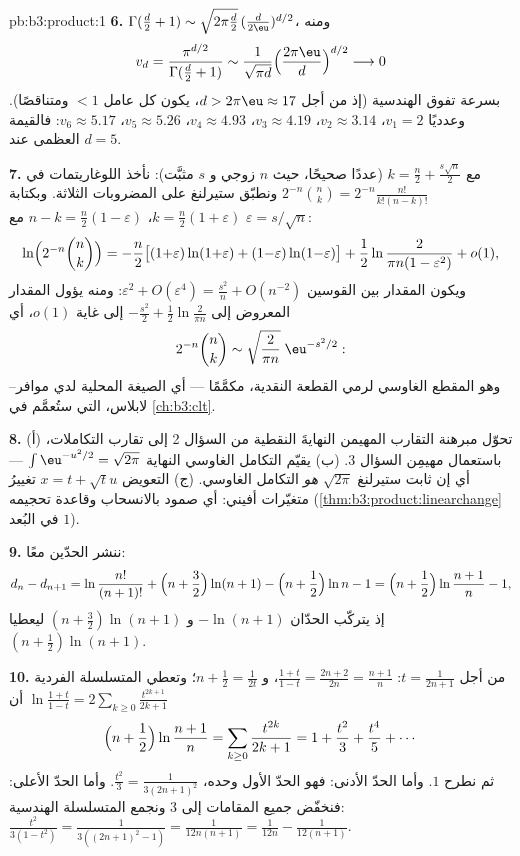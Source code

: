 \begin{solution}{pb:b3:product:1}
\textbf{6.} $\Gamma(\frac d2 + 1) \sim \sqrt{2\pi\frac
d2}\,(\frac d{2\eu})^{d/2}$، ومنه
\[
v_d = \frac{\pi^{d/2}}{\Gamma(\frac d2 + 1)}
\sim \frac{1}{\sqrt{\pi d}}\Bigl(\frac{2\pi\eu}
d\Bigr)^{d/2} \longrightarrow 0
\]
بسرعة تفوق الهندسية (إذ من أجل $d > 2\pi\eu \approx 17$، يكون كل عامل
$< 1$ ومتناقصًا). وعدديًا $v_1 = 2$، $v_2 \approx
3.14$، $v_3 \approx 4.19$،
$v_4 \approx 4.93$، $v_5 \approx
5.26$، $v_6 \approx 5.17$: فالقيمة العظمى عند $d = 5$.

\textbf{7.} مع $k = \frac n2 + \frac{s\sqrt n}2$ (عددًا صحيحًا، حيث $n$ زوجي و $s$
مثبَّت): نأخذ اللوغاريتمات في $2^{-n}\binom nk =
2^{-n}\frac{n!}{k!(n-k)!}$ ونطبّق ستيرلنغ على
المضروبات الثلاثة. وبكتابة $k = \frac n2(1 + \varepsilon)$، $n - k =
\frac n2(1 - \varepsilon)$ مع $\varepsilon = s/\sqrt n$:
\[
\ln\Bigl(2^{-n}\binom nk\Bigr)
= -\frac n2\bigl[(1{+}\varepsilon)\ln(1{+}\varepsilon) +
(1{-}\varepsilon)\ln(1{-}\varepsilon)\bigr]
+ \frac12\ln\frac{2}{\pi n(1 - \varepsilon^2)} + o(1),
\]
ويكون المقدار بين القوسين $\varepsilon^2 + O(\varepsilon^4) =
\frac{s^2}n + O(n^{-2})$: ومنه يؤول المقدار المعروض
إلى $-\frac{s^2}2 +
\frac12\ln\frac2{\pi n}$ إلى غاية $o(1)$، أي
\[
2^{-n}\binom nk \sim \sqrt{\frac{2}{\pi
n}}\;\eu^{-s^2/2} :
\]
وهو المقطع الغاوسي لرمي القطعة النقدية، مكمَّمًا --- أي الصيغة
المحلية لدي موافر--لابلاس، التي ستُعمَّم في
\cref{ch:b3:clt}.

\textbf{8.} (أ) تحوّل مبرهنة التقارب المهيمن النهايةَ النقطية
من السؤال 2 إلى تقارب التكاملات، باستعمال مهيمِن السؤال 3.
(ب) يقيّم التكامل الغاوسي النهاية
$\int\eu^{-u^2/2} = \sqrt{2\pi}$ --- أي إن ثابت ستيرلنغ
$\sqrt{2\pi}$ \emph{هو} التكامل الغاوسي. (ج) التعويض
$x = t + \sqrt tu$ تغييرُ متغيّرات أفيني: أي صمود  بالانسحاب
وقاعدة تحجيمه (\cref{thm:b3:product:linearchange} في
البُعد $1$).

\textbf{9.} ننشر الحدّين معًا:
\[
d_n - d_{n+1} = \ln\frac{n!}{(n+1)!} + \Bigl(n +
\frac32\Bigr)\ln(n+1) - \Bigl(n + \frac12\Bigr)\ln n - 1
= \Bigl(n + \frac12\Bigr)\ln\frac{n+1}n - 1,
\]
إذ يتركّب الحدّان $-\ln(n+1)$ و $(n + \frac32)\ln(n+1)$
ليعطيا $(n + \frac12)\ln(n+1)$.

\textbf{10.} من أجل $t = \frac1{2n+1}$: $\frac{1+t}{1-t} =
\frac{2n+2}{2n} = \frac{n+1}n$، و $n + \frac12 =
\frac1{2t}$؛ وتعطي
المتسلسلة الفردية $\ln\frac{1+t}{1-t} =
2\sum_{k\geq0}\frac{t^{2k+1}}{2k+1}$ أن
\[
\Bigl(n + \frac12\Bigr)\ln\frac{n+1}n
= \sum_{k\geq0}\frac{t^{2k}}{2k+1}
= 1 + \frac{t^2}3 + \frac{t^4}5 + \cdots
\]
ثم نطرح $1$. وأما الحدّ الأدنى: فهو الحدّ الأول وحده،
$\frac{t^2}3 = \frac1{3(2n+1)^2}$. وأما الحدّ الأعلى: فنخفّض جميع المقامات إلى $3$ ونجمع
المتسلسلة الهندسية:
$\frac{t^2}{3(1 - t^2)} = \frac1{3((2n+1)^2 - 1)} =
\frac1{12n(n+1)} = \frac1{12n} - \frac1{12(n+1)}$.


\end{solution}
